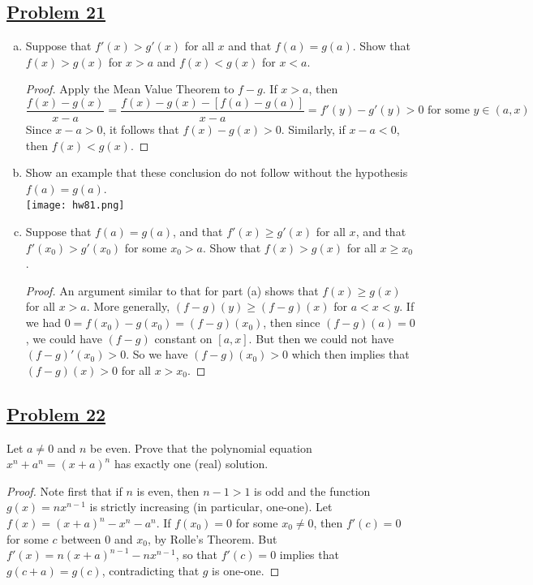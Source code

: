 \documentclass[10pt,letterpaper]{article}
\begin{document}
	
	\subsection*{{\color{purple}\underline{Problem 21}}}
	\begin{enumerate}[(a)]
	\item Suppose that $f'(x) > g'(x)$ for all $x$ and that $f(a) = g(a)$. Show that
	$f(x) > g(x)$ for $x > a$ and $f(x) < g(x)$ for $x < a$.
	\begin{proof}
	Apply the Mean Value Theorem to $f - g$. If $x > a$, then 
$$\dfrac{f(x) - g(x)}{x - a} = \dfrac{f(x) - g(x) -[f(a) - g(a)]}{x - a}
= f'(y) - g'(y) > 0 \text{ for some } y \in (a, x)$$
	Since $x - a > 0$, it follows that $f(x) - g(x) > 0$. Similarly, if $x - a < 0$,
	then $f(x) < g(x)$.	
	\end{proof}
	
	\item Show an example that these conclusion do not follow without the hypothesis
	$f(a) = g(a)$. \\
	\texttt{[image: hw81.png]} \\
	\item Suppose that $f(a) = g(a)$, and that $f'(x) \geq g'(x)$ for all $x$, and that
	$f'(x_0) > g'(x_0)$ for some $x_0 > a$. Show that $f(x) > g(x)$ for all $x \geq x_0$.
	\begin{proof}
		An argument similar to that for part (a) shows that $f(x) \geq g(x)$ for all 
		$x > a$. More generally, $(f - g)(y) \geq (f - g)(x)$ for $a < x < y$. If we
		had $0 = f(x_0) - g(x_0) = (f - g)(x_0)$, then since $(f - g)(a) = 0$, we could
		have $(f - g)$ constant on $[a, x]$. But then we could not have $(f - g)'(x_0) > 0$.
		So we have $(f - g)(x_0) > 0$ which then implies that $(f - g)(x) > 0$ for all $x > x_0$.		
	\end{proof}
	\end{enumerate}		
	
		
	\subsection*{{\color{purple}\underline{Problem 22}}}
	Let $a \neq 0$ and $n$ be even. Prove that the polynomial
	equation $x^n + a^n = (x + a)^n$ has exactly one (real) solution.
	\begin{proof}
	Note first that if $n$ is even, then $n − 1 > 1$ is
	odd and the function $g(x) = nx^{n-1}$ is strictly increasing (in
		particular, one-one).
	Let $f(x) = (x + a)^n - x^n - a^n$. If $f(x_0) = 0$ for some
	$x_0 \neq 0$, then $f'(c) = 0$ for some $c$ between $0$ and $x_0$, 
	by Rolle’s Theorem. But $f'(x) = n(x + a)^{n-1} - nx^{n-1}$, so that
	$f'(c) = 0$ implies that $g(c + a) = g(c)$, contradicting that $g$ is
	one-one.
	\end{proof}
	
\end{document}
